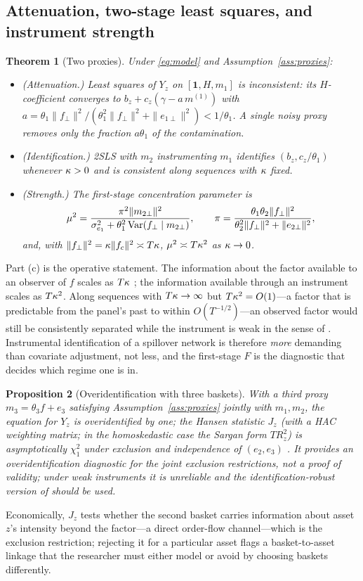 \documentclass[12pt]{article}
\theoremstyle{plain}\newtheorem{theorem}{Theorem}[section]\newtheorem{proposition}[theorem]{Proposition}\newtheorem{lemma}[theorem]{Lemma}\newtheorem{corollary}[theorem]{Corollary}
\theoremstyle{definition}\newtheorem{definition}[theorem]{Definition}\newtheorem{assumption}[theorem]{Assumption}\newtheorem{remark}[theorem]{Remark}
\begin{document}
\subsection{Attenuation, two-stage least squares, and instrument strength}
\begin{theorem}[Two proxies]\label{thm:iv}
Under \eqref{eq:model} and Assumption~\ref{ass:proxies}:
\begin{itemize}
\item[(a)] \emph{(Attenuation.)} Least squares of $Y_z$ on $[\mathbf 1,H,m_1]$ is inconsistent: its $H$-coefficient converges to $b_z+c_z(\gamma-a\,m^{(1)})$ with $a=\theta_1\|f_\perp\|^2/(\theta_1^2\|f_\perp\|^2+\|e_{1\perp}\|^2)<1/\theta_1$. A single noisy proxy removes only the fraction $a\theta_1$ of the contamination.
\item[(b)] \emph{(Identification.)} 2SLS with $m_2$ instrumenting $m_1$ identifies $(b_z,c_z/\theta_1)$ whenever $\kappa>0$ and is consistent along sequences with $\kappa$ fixed.
\item[(c)] \emph{(Strength.)} The first-stage concentration parameter is
\[
\mu^2=\frac{\pi^2\|m_{2\perp}\|^2}{\sigma_{e_1}^2+\theta_1^2\operatorname{Var}(f_\perp\mid m_{2\perp})},\qquad \pi=\frac{\theta_1\theta_2\|f_\perp\|^2}{\theta_2^2\|f_\perp\|^2+\|e_{2\perp}\|^2},
\]
and, with $\|f_\perp\|^2=\kappa\|f_c\|^2\asymp T\kappa$, $\mu^2\asymp T\kappa^2$ as $\kappa\to0$.
\end{itemize}
\end{theorem}
Part (c) is the operative statement. The information about the factor available to an observer of $f$ scales as $T\kappa$ \citep{companion2026}; the information available through an instrument scales as $T\kappa^2$. Along sequences with $T\kappa\to\infty$ but $T\kappa^2=O(1)$---a factor that is predictable from the panel's past to within $O(T^{-1/2})$---an observed factor would still be consistently separated while the instrument is weak in the sense of \citet{staiger1997}. Instrumental identification of a spillover network is therefore \emph{more} demanding than covariate adjustment, not less, and the first-stage $F$ is the diagnostic that decides which regime one is in.

\begin{proposition}[Overidentification with three baskets]\label{prop:overid}
With a third proxy $m_3=\theta_3f+e_3$ satisfying Assumption~\ref{ass:proxies} jointly with $m_1,m_2$, the equation for $Y_z$ is overidentified by one; the Hansen statistic $J_z$ (with a HAC weighting matrix; in the homoskedastic case the Sargan form $TR^2_z$) is asymptotically $\chi^2_1$ under exclusion and independence of $(e_2,e_3)$ \citep{sargan1958,hansen1982}. It provides an overidentification diagnostic for the joint exclusion restrictions, not a proof of validity; under weak instruments it is unreliable and the identification-robust version of \citet{kleibergen2005} should be used.
\end{proposition}
Economically, $J_z$ tests whether the second basket carries information about asset $z$'s intensity beyond the factor---a direct order-flow channel---which is the exclusion restriction; rejecting it for a particular asset flags a basket-to-asset linkage that the researcher must either model or avoid by choosing baskets differently.
\end{document}
